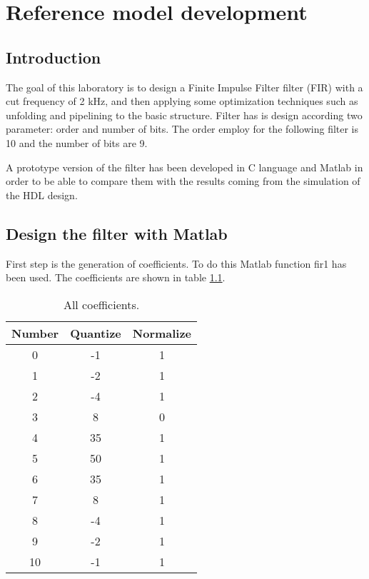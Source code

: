 %
\chapter{Reference model development}
\label{chap1}


\section{Introduction}

The goal of this laboratory is to design a Finite Impulse Filter filter (FIR) with a cut frequency of 2 kHz, and then applying some optimization 
techniques such as unfolding and pipelining to the basic structure.
Filter has is design according two parameter: order and number of bits. The order employ for the following filter
is 10 and the number of bits are 9.

A prototype version of the filter has been developed in C language and Matlab in order to be able to compare them with the
results coming from the simulation of the HDL design.

\section{Design the filter with Matlab}

First step is the generation of coefficients. To do this Matlab function fir1 has been used.
The coefficients are shown in table \ref{tab:1}. %

\begin{table}[ht]
\centering
\begin{tabular}{c|c|c}
\toprule
Number & Quantize & Normalize \\
\midrule
0 & -1 & 1 \\
1 & -2 & 1 \\
2 & -4 & 1 \\
3 & 8 & 0 \\
4 & 35 & 1 \\
5 & 50 & 1 \\
6 & 35 & 1 \\
7 & 8 & 1 \\
8 & -4 & 1 \\
9 & -2 & 1 \\
10 & -1 & 1 \\
\bottomrule
\end{tabular}
\caption{All coefficients.}
\label{tab:1}
\end{table}

